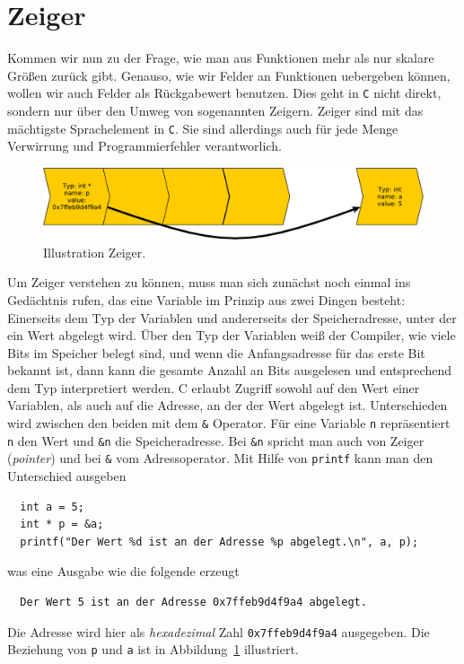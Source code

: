 
\section{Zeiger}

Kommen wir nun zu der Frage, wie man aus Funktionen mehr als nur skalare Größen zurück gibt.
Genauso, wie wir Felder an Funktionen uebergeben können, wollen wir auch Felder als Rückgabewert benutzen.
Dies geht in \texttt{C} nicht direkt, sondern nur über den Umweg von sogenannten Zeigern.
Zeiger sind mit das mächtigste Sprachelement in \texttt{C}.
Sie sind allerdings auch für jede Menge Verwirrung und Programmierfehler verantworlich.

\begin{figure}[h]
  \centering
  \includegraphics[width=\linewidth]{pointer-crop}
  \caption{\label{pointfig} Illustration Zeiger.}
\end{figure}


Um Zeiger verstehen zu können, muss man sich zunächst noch einmal ins Gedächtnis rufen, das eine Variable im Prinzip aus zwei Dingen besteht:
Einerseits dem Typ der Variablen und andererseits der Speicheradresse, unter der ein Wert abgelegt wird.
Über den Typ der Variablen weiß der Compiler, wie viele Bits im Speicher belegt sind, und wenn die Anfangsadresse für das erste Bit bekannt ist, dann kann die gesamte Anzahl an Bits ausgelesen und entsprechend dem Typ interpretiert werden.
C erlaubt Zugriff sowohl auf den Wert einer Variablen, als auch auf die Adresse, an der der Wert abgelegt ist.
Unterschieden wird zwischen den beiden mit dem \verb|&| Operator.
Für eine Variable \verb|n| repräsentiert \verb|n| den Wert und \verb|&n| die Speicheradresse.
Bei \verb|&n| spricht man auch von Zeiger (\emph{pointer}) und bei \verb|&| vom Adressoperator.
Mit Hilfe von \texttt{printf} kann man den Unterschied ausgeben
\begin{lstlisting}
  int a = 5;
  int * p = &a;
  printf("Der Wert %d ist an der Adresse %p abgelegt.\n", a, p);
\end{lstlisting}
was eine Ausgabe wie die folgende erzeugt
\begin{verbatim}
  Der Wert 5 ist an der Adresse 0x7ffeb9d4f9a4 abgelegt.
\end{verbatim}
Die Adresse wird hier als \emph{hexadezimal} Zahl \verb|0x7ffeb9d4f9a4| ausgegeben.
Die Beziehung von \verb|p| und \verb|a| ist in Abbildung~\ref{pointfig} illustriert.

